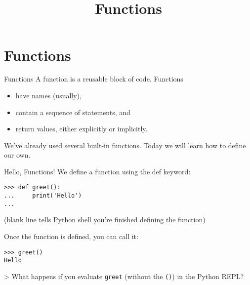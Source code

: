 \documentclass[smaller, aspectratio=1610]{beamer}
\date{}
\title{Functions}
\begin{document}
\maketitle

\section{Functions}
\label{sec:org2bbeba0}

\begin{frame}[label={sec:org237e2a8}]{Functions}
A function is a reusable block of code. Functions

\begin{itemize}
\item have names (usually),
\item contain a sequence of statements, and
\item return values, either explicitly or implicitly.
\end{itemize}

We've already used several built-in functions. Today we will learn how to define our own.
\end{frame}

\begin{frame}[label={sec:org5ce04a4},fragile]{Hello, Functions!}
 We define a function using the def keyword:

\lstset{language=Python,label= ,caption= ,captionpos=b,numbers=none}
\begin{lstlisting}
>>> def greet():
...     print('Hello')
...
\end{lstlisting}

(blank line tells Python shell you're finished defining the function)

Once the function is defined, you can call it:

\lstset{language=Python,label= ,caption= ,captionpos=b,numbers=none}
\begin{lstlisting}
>>> greet()
Hello
\end{lstlisting}

> What happens if you evaluate \texttt{greet} (without the \texttt{()}) in the Python REPL?
\end{frame}
\end{document}
